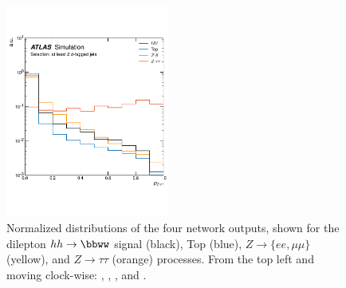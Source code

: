 \begin{figure}[!htb]
\begin{center}
        \includegraphics[width=0.48\textwidth]{figures/search_hh/nn_disc/pi_plot_NN_p_ztt}
        \caption{
            Normalized distributions of the four network outputs,
            shown for the dilepton
            $hh \rightarrow \bbww$ signal (black), Top (blue), $Z \rightarrow \{ee,\mu\mu\}$ (yellow),
            and $Z\rightarrow \tau\tau$ (orange) processes.
            From the top left and moving clock-wise: \phh, \ptop, \pztt, and \pzsf.
        }
        \label{fig:nn_disc_p}
    \end{center}
\end{figure}

